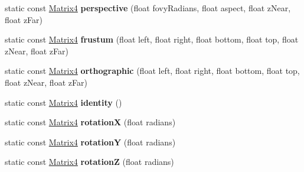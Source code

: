\begin{DoxyCompactItemize}
\item 
\hypertarget{classVectormath_1_1Aos_1_1Matrix4_a5c56753075ff7fc280c7534f0f7f3310}{static const \hyperlink{classVectormath_1_1Aos_1_1Matrix4}{Matrix4} {\bfseries perspective} (float fovy\-Radians, float aspect, float z\-Near, float z\-Far)}\label{classVectormath_1_1Aos_1_1Matrix4_a5c56753075ff7fc280c7534f0f7f3310}

\item 
\hypertarget{classVectormath_1_1Aos_1_1Matrix4_ad1b95c29754cf39128f5c90779a53d2e}{static const \hyperlink{classVectormath_1_1Aos_1_1Matrix4}{Matrix4} {\bfseries frustum} (float left, float right, float bottom, float top, float z\-Near, float z\-Far)}\label{classVectormath_1_1Aos_1_1Matrix4_ad1b95c29754cf39128f5c90779a53d2e}

\item 
\hypertarget{classVectormath_1_1Aos_1_1Matrix4_af2bb0513df5fa3be77b5cef316c94249}{static const \hyperlink{classVectormath_1_1Aos_1_1Matrix4}{Matrix4} {\bfseries orthographic} (float left, float right, float bottom, float top, float z\-Near, float z\-Far)}\label{classVectormath_1_1Aos_1_1Matrix4_af2bb0513df5fa3be77b5cef316c94249}

\item 
\hypertarget{classVectormath_1_1Aos_1_1Matrix4_a4f84a22403618b3dfffd7f410dd31697}{static const \hyperlink{classVectormath_1_1Aos_1_1Matrix4}{Matrix4} {\bfseries identity} ()}\label{classVectormath_1_1Aos_1_1Matrix4_a4f84a22403618b3dfffd7f410dd31697}

\item 
\hypertarget{classVectormath_1_1Aos_1_1Matrix4_a5727665fe6a8f581e578c9ca268da7f1}{static const \hyperlink{classVectormath_1_1Aos_1_1Matrix4}{Matrix4} {\bfseries rotation\-X} (float radians)}\label{classVectormath_1_1Aos_1_1Matrix4_a5727665fe6a8f581e578c9ca268da7f1}

\item 
\hypertarget{classVectormath_1_1Aos_1_1Matrix4_a083cd75aa544d7760d85a989da2d1211}{static const \hyperlink{classVectormath_1_1Aos_1_1Matrix4}{Matrix4} {\bfseries rotation\-Y} (float radians)}\label{classVectormath_1_1Aos_1_1Matrix4_a083cd75aa544d7760d85a989da2d1211}

\item 
\hypertarget{classVectormath_1_1Aos_1_1Matrix4_a1f6d2e00f90838b9c79616f0ef13de66}{static const \hyperlink{classVectormath_1_1Aos_1_1Matrix4}{Matrix4} {\bfseries rotation\-Z} (float radians)}\label{classVectormath_1_1Aos_1_1Matrix4_a1f6d2e00f90838b9c79616f0ef13de66}


\end{DoxyCompactItemize}
